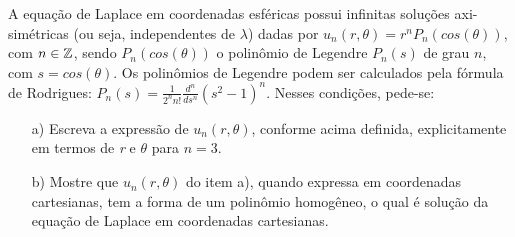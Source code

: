 \linespread{1.5}

A equação de Laplace em coordenadas esféricas possui infinitas soluções axi-simétricas (ou seja, independentes de $\lambda$) dadas por $u_n(r, \theta) = r^nP_n(cos(\theta))$, com $n\in\mathbb{Z}$, sendo $P_n(cos(\theta))$ o polinômio de Legendre $P_n(s)$ de grau $n$, com $s = cos(\theta)$. Os polinômios de Legendre podem ser calculados pela fórmula de Rodrigues: $P_n(s) = \frac{1}{2^n n!}\frac{d^n}{ds^n}(s^2-1)^n$. Nesses condições, pede-se:
\begin{itemize}
    \item[a)] Escreva a expressão de $u_n(r, \theta)$, conforme acima definida, explicitamente em termos de \textit{r} e $\theta$ para $n = 3$.
    \item[b)] Mostre que $u_n (r, \theta)$ do item a), quando expressa em coordenadas cartesianas, tem a forma de um polinômio homogêneo, o qual é solução da equação de Laplace em coordenadas cartesianas.
\end{itemize}